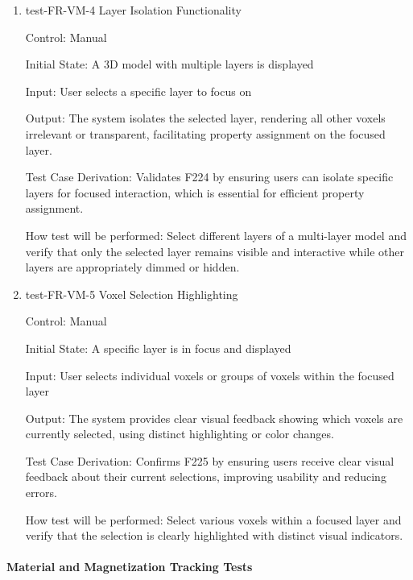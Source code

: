 \documentclass[12pt, titlepage]{article}
\begin{document}
\begin{enumerate}

\item{test-FR-VM-4 Layer Isolation Functionality\\}

Control: Manual
					
Initial State: A 3D model with multiple layers is displayed
					
Input: User selects a specific layer to focus on
					
Output: The system isolates the selected layer, rendering all other voxels irrelevant
or transparent, facilitating property assignment on the focused layer.

Test Case Derivation: Validates F224 by ensuring users can isolate specific layers
for focused interaction, which is essential for efficient property assignment.
					
How test will be performed: Select different layers of a multi-layer model and verify
that only the selected layer remains visible and interactive while other layers are
appropriately dimmed or hidden.

\item{test-FR-VM-5 Voxel Selection Highlighting\\}

Control: Manual
					
Initial State: A specific layer is in focus and displayed
					
Input: User selects individual voxels or groups of voxels within the focused layer
					
Output: The system provides clear visual feedback showing which voxels are currently
selected, using distinct highlighting or color changes.

Test Case Derivation: Confirms F225 by ensuring users receive clear visual feedback
about their current selections, improving usability and reducing errors.
					
How test will be performed: Select various voxels within a focused layer and verify
that the selection is clearly highlighted with distinct visual indicators.

\end{enumerate}

\paragraph{Material and Magnetization Tracking Tests}
\end{document}
